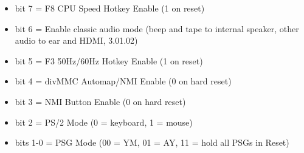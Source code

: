 \begin{itemize}
\item bit 7 = F8 CPU Speed Hotkey Enable (1 on reset)
\item bit 6 = Enable classic audio mode (beep and tape to internal speaker,
  other audio to ear and HDMI, 3.01.02)
\item bit 5 = F3 50Hz/60Hz Hotkey Enable (1 on reset)
\item bit 4 = divMMC Automap/NMI Enable (0 on hard reset)
\item bit 3 = NMI Button Enable (0 on hard reset)
\item bit 2 = PS/2 Mode (0 = keyboard, 1 = mouse)
\item bits 1-0 = PSG Mode (00 = YM, 01 = AY, 11 = hold all PSGs in Reset)
\end{itemize}

